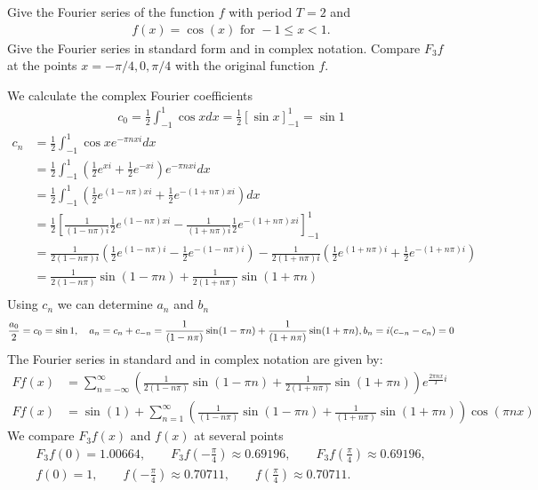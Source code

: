 \documentclass[11pt]{article}
\begin{document}
\begin{exercise}
    Give the Fourier series of the function $f$ with period $T = 2$ and 
    \begin{gather*}
        f(x) = \cos(x) \text{ for } -1 \leq x < 1.
    \end{gather*}
    Give the Fourier series in standard form and in complex notation. 
    Compare $F_3 f$ at the points $x = -\pi/4, 0, \pi/4$ with the original function $f$.
\end{exercise}
\begin{solution}    
We calculate the complex Fourier coefficients 
\begin{align*}
    c_0 = \frac 1 2 \int_{-1}^1 \cos x dx = \frac 1 2 [\sin x]_{-1}^1 = \sin 1
\end{align*}
\begin{align*}
    c_n &= \frac 1 2 \int_{-1}^1 \cos x e^{-\pi n x i} dx\\
    &= \frac 1 2 \int_{-1}^1 \left(\frac 1 2 e^{x i} + \frac 1 2 e^{-x i} \right) e^{-\pi n x i} dx\\
    &= \frac 1 2 \int_{-1}^1 \left(\frac 1 2 e^{(1-n\pi)x i} + \frac 1 2 e^{-(1+n\pi)x i} \right) dx\\
    &= \frac 1 2\left[\frac{1}{(1-n\pi) i}\frac 1 2 e^{(1-n\pi)x i} - \frac{1}{(1+n\pi) i}\frac 1 2 e^{-(1+n\pi)x i} \right]_{-1}^1\\
    &= \frac{1}{2(1-n\pi) i}\left( \frac 1 2 e^{(1-n\pi)i}- \frac 1 2 e^{-(1-n\pi) i}\right) - \frac{1}{2(1+n\pi) i}\left( \frac 1 2 e^{(1+n\pi)i}+ \frac 1 2 e^{-(1+n\pi) i}\right)\\
    &= \frac{1}{2(1-n\pi)}\sin(1-\pi n) + \frac{1}{2(1+n\pi)}\sin(1+\pi n)\\
\end{align*}
Using $c_n$ we can determine $a_n$ and $b_n$
$$
    \frac{a_0}{2} = c_0 = \sin 1,
    \quad 
    a_n = c_n + c_{-n} = \frac{1}{(1-n\pi)}\sin(1-\pi n) + \frac{1}{(1+n\pi)}\sin(1+\pi n),
    \\
    b_n = i(c_{-n} - c_{n}) = 0
$$
The Fourier series in standard and in complex notation are given by:
\begin{align*}
    F f(x)&=\sum_{n=-\infty}^{\infty} \left(\frac{1}{2(1-n\pi)}\sin(1-\pi n) + \frac{1}{2(1+n\pi)}\sin(1+\pi n)\right) e^{\frac{2 \pi n x}{T} i}
    \\
    F f(x)&=\sin(1)+\sum_{n=1}^{\infty} \left(  \frac{1}{(1-n\pi) }\sin(1-\pi n) + \frac{1}{(1+n\pi)}\sin(1+\pi n) \right) \cos \left(\pi n x\right)
\end{align*}
We compare $F_3f(x)$ and $f(x)$ at several points 
\begin{gather*}
    F_3f(0) = 1.00664,\qquad 
    F_3f\left(-\frac{\pi}{4}\right) \approx 0.69196,\qquad 
    F_3f\left(\frac{\pi}{4}\right) \approx 0.69196,
    \\
    f(0) = 1,\qquad 
    f\left(-\frac{\pi}{4}\right) \approx 0.70711,\qquad
    f\left(\frac{\pi}{4}\right) \approx 0.70711.
\end{gather*}

\end{solution}
\end{document}
